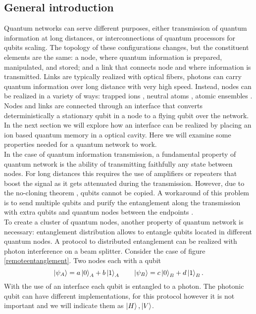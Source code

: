 \subsection{General introduction}
Quantum networks can serve different purposes, either transmission of quantum information at long distances, or interconnections of quantum processors for qubits scaling. The topology of these configurations changes, but the constituent elements are the same: a node, where quantum information is prepared, manipulated, and stored; and a link that connects node and where information is transmitted. Links are typically realized with optical fibers, photons can carry quantum information over long distance with very high speed. Instead, nodes can be realized in a variety of ways: trapped ions \cite{ion_quantumnetwork}, neutral atoms \cite{Ritter2012}, atomic ensembles \cite{kimble}. Nodes and links are connected through an interface that converts deterministically a stationary qubit in a node to a flying qubit over the network. In the next section we will explore how an interface can be realized by placing an ion based quantum memory in a optical cavity. Here we will examine some properties needed for a quantum network to work.\\
In the case of quantum information transmission, a fundamental property of quantum network is the ability of transmitting faithfully any state between nodes. For long distances this requires the use of amplifiers or repeaters that boost the signal as it gets attenuated during the transmission. However, due to the no-cloning theorem \cite{nocloning}, qubits cannot be copied. A workaround of this problem is to send multiple qubits and purify the entanglement along the transmission with extra qubits and quantum nodes between the endpoints \cite{quantumrepeters}.\\
To create a cluster of quantum nodes, another property of quantum network is necessary: entanglement distribution allows to entangle qubits located in different quantum nodes. A protocol to distributed entanglement can be realized with photon interference on a beam splitter. Consider the case of figure \ref{remoteentanglement}. Two nodes each with a qubit
\begin{equation}
\ket{\psi_A} = a\ket{0}_A + b\ket{1}_A \qquad \ket{\psi_B} = c\ket{0}_B + d\ket{1}_B.
\end{equation}
With the use of an interface each qubit is entangled to a photon. The photonic qubit can have different implementations, for this protocol however it is not important and we will indicate them as $\ket{H},\ket{V}$.
